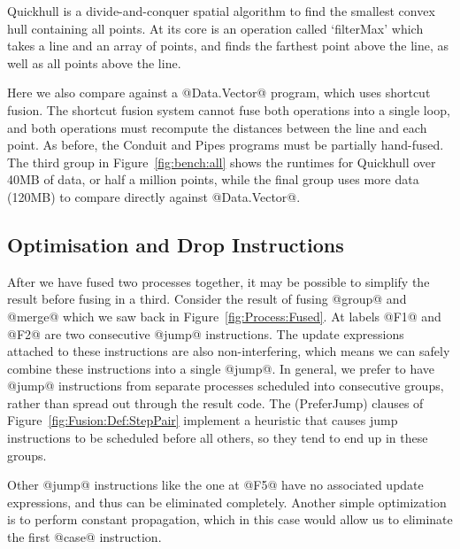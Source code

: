 Quickhull is a divide-and-conquer spatial algorithm to find the smallest convex hull containing all points.
At its core is an operation called `filterMax' which takes a line and an array of points, and finds the farthest point above the line, as well as all points above the line.

Here we also compare against a @Data.Vector@ program, which uses shortcut fusion.
The shortcut fusion system cannot fuse both operations into a single loop, and both operations must recompute the distances between the line and each point.
As before, the Conduit and Pipes programs must be partially hand-fused.
The third group in Figure~\ref{fig:bench:all} shows the runtimes for Quickhull over 40MB of data, or half a million points, while the final group uses more data (120MB) to compare directly against @Data.Vector@.


\subsection{Optimisation and Drop Instructions}
\label{s:Optimisation}
After we have fused two processes together, it may be possible to simplify the result before fusing in a third. Consider the result of fusing @group@ and @merge@ which we saw back in Figure~\ref{fig:Process:Fused}. At labels @F1@ and @F2@ are two consecutive @jump@ instructions. The update expressions attached to these instructions are also non-interfering, which means we can safely combine these instructions into a single @jump@. In general, we prefer to have @jump@ instructions from separate processes scheduled into consecutive groups, rather than spread out through the result code. The (PreferJump) clauses of Figure~\ref{fig:Fusion:Def:StepPair} implement a heuristic that causes jump instructions to be scheduled before all others, so they tend to end up in these groups.

Other @jump@ instructions like the one at @F5@ have no associated update expressions, and thus can be eliminated completely. Another simple optimization is to perform constant propagation, which in this case would allow us to eliminate the first @case@ instruction. 


